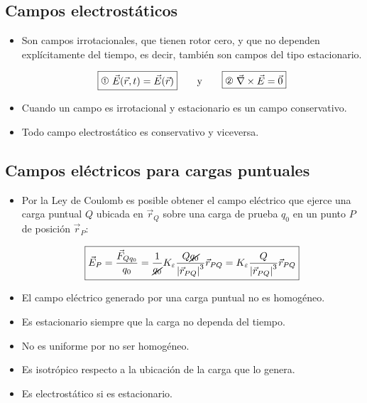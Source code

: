 \documentclass[a4paper,10pt]{article}
\begin{document}
\subsection*{Campos electrostáticos}

\begin{itemize}

\item Son campos irrotacionales, que tienen rotor cero, y que no dependen
explícitamente del tiempo, es decir, tambi\'en son campos del tipo estacionario.

\begin{equation*}
    \boxed{\textrm{\ding{192} }\vec{E}(\vec{r},t)=\vec{E}(\vec{r})}
    \qquad\textrm{y}\qquad
    \boxed{\textrm{\ding{193} }\vec{\nabla}\times\vec{E}=\vec{0}}
\end{equation*}

\item Cuando un campo es irrotacional y estacionario es un campo conservativo.

\item Todo campo electrostático es conservativo y viceversa.

\end{itemize}

\subsection*{Campos el\'ectricos para cargas puntuales}

\begin{itemize}

\item Por la Ley de Coulomb es posible obtener el campo el\'ectrico que ejerce una
carga puntual $Q$ ubicada en $\vec{r}_Q$ sobre una carga de prueba $q_0$ en un punto $P$
de posici\'on $\vec{r}_P$:

\begin{equation*}
    \boxed{\vec{E}_P=
    \frac{\vec{F}_{Qq_0}}{q_0}=\frac{1}{\cancel{q_0}}K_\varepsilon\frac{Q\cancel{q_0}}
    {\left\lvert\vec{r}_{PQ}\right\lvert^3}\vec{r}_{PQ}=
    K_\varepsilon\frac{Q}{\left\lvert\vec{r}_{PQ}\right\lvert^3}\vec{r}_{PQ}}
\end{equation*}

\item El campo el\'ectrico generado por una carga puntual no es homog\'eneo.

\item Es estacionario siempre que la carga no dependa del tiempo.

\item No es uniforme por no ser homog\'eneo.

\item Es isotr\'opico respecto a la ubicaci\'on de la carga que lo genera.

\item Es electrost\'atico si es estacionario.

\end{itemize}
\end{document}
